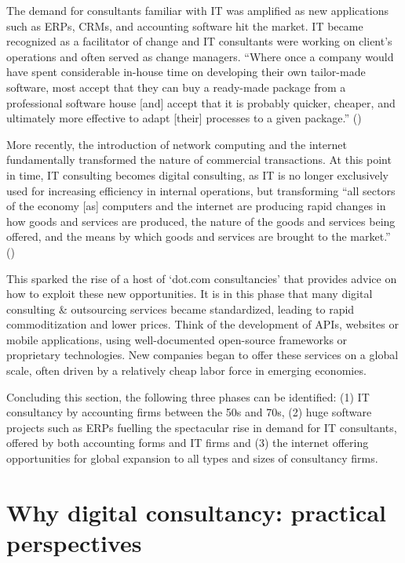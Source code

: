 \documentclass[
  man,floatsintext]{apa6}
\begin{document}
The demand for consultants familiar with IT was amplified as new applications such as ERPs, CRMs, and accounting software hit the market. IT became recognized as a facilitator of change and IT consultants were working on client's operations and often served as change managers. ``Where once a company would have spent considerable in-house time on developing their own tailor-made software, most accept that they can buy a ready-made package from a professional software house {[}and{]} accept that it is probably quicker, cheaper, and ultimately more effective to adapt {[}their{]} processes to a given package.'' ()

More recently, the introduction of network computing and the internet fundamentally transformed the nature of commercial transactions. At this point in time, IT consulting becomes digital consulting, as IT is no longer exclusively used for increasing efficiency in internal operations, but transforming ``all sectors of the economy {[}as{]} computers and the internet are producing rapid changes in how goods and services are produced, the nature of the goods and services being offered, and the means by which goods and services are brought to the market.'' ()

This sparked the rise of a host of `dot.com consultancies' that provides advice on how to exploit these new opportunities. It is in this phase that many digital consulting \& outsourcing services became standardized, leading to rapid commoditization and lower prices. Think of the development of APIs, websites or mobile applications, using well-documented open-source frameworks or proprietary technologies. New companies began to offer these services on a global scale, often driven by a relatively cheap labor force in emerging economies.

Concluding this section, the following three phases can be identified: (1) IT consultancy by accounting firms between the 50s and 70s, (2) huge software projects such as ERPs fuelling the spectacular rise in demand for IT consultants, offered by both accounting forms and IT firms and (3) the internet offering opportunities for global expansion to all types and sizes of consultancy firms.

\section{Why digital consultancy: practical perspectives}\label{why-digital-consultancy-practical-perspectives}
\end{document}
